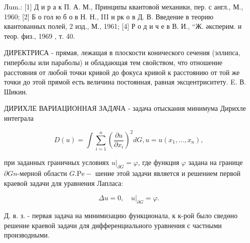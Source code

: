 \documentclass[10pt]{article}
\begin{document}
Лum.: [1] Д и р а к П. А. М., Принципы квантовой механики, пер. с англ., М., 1960; [2] Б о гол ю б о в Н. Н., III и рк о в Д. В. Введение в теорию квантованных полей, 2 изд., М., 1961; [4] Р о д и ч е в В. И., “Ж. әксперим. и теор. физ., 1969 , т. 40.



ДИРЕКТРИСА - прямая, лежащая в плоскости конического сечения (эллипса, гиперболы или параболы) и обладающая тем свойством, что отношение расстояния от любой точки кривой до фокуса кривой к расстоянию от той же точки до этой прямой есть величина постоянная, равная эксцентриситету. E. В. Шикин.



ДИРИХЛЕ ВАРИАЦИОННАЯ ЗАДАЧА - задача отыскания минимума Дирихле интеграла



\[

D(u)=\int \sum_{i=1}^{n}\left(\frac{\partial u}{\partial x_{i}}\right)^{2} d G, u=u\left(x_{1}, \ldots, x_{n}\right),

\]



при заданных граничных условиях $\left.u\right|_{\partial G}=\varphi$, где функция $\varphi$ задана на границе $\partial G n$-мерной области $G . \mathrm{Pe}-$ шение этой задачи является и решением первой краевой задачи для уравнения Лапласа:



\[

\Delta u=0,\left.\quad u\right|_{\partial G}=\varphi .

\]



Д. в. з. - первая задача на минимизацию функционала, к к-рой было сведөно решение краевой задачи для дифференциального уравнения с частными производными.
\end{document}
